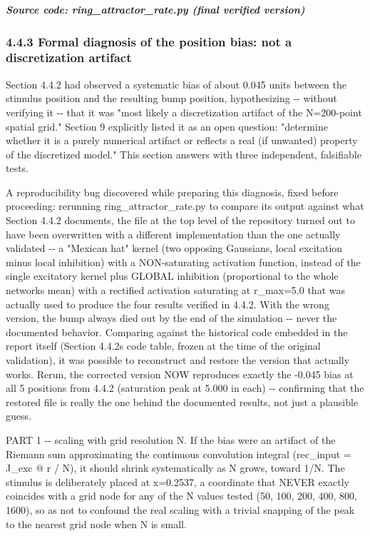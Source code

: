 \documentclass[
  english,
]{article}
\begin{document}
\textit{\textbf{Source code: ring\_\allowbreak{}attractor\_\allowbreak{}rate.py (final verified version)}}


\subsubsection{4.4.3 Formal diagnosis of the position bias: not a discretization artifact}\label{formal-diagnosis-of-the-position-bias-not-a-discretization-artifact}

Section 4.4.2 had observed a systematic bias of about 0.045 units between the stimulus position and the resulting bump position, hypothesizing -\/- without verifying it -\/- that it was "most likely a discretization artifact of the N=200-point spatial grid." Section 9 explicitly listed it as an open question: "determine whether it is a purely numerical artifact or reflects a real (if unwanted) property of the discretized model." This section answers with three independent, falsifiable tests.

A reproducibility bug discovered while preparing this diagnosis, fixed before proceeding: rerunning ring\_\allowbreak{}attractor\_\allowbreak{}rate.py to compare its output against what Section 4.4.2 documents, the file at the top level of the repository turned out to have been overwritten with a different implementation than the one actually validated -\/- a "Mexican hat" kernel (two opposing Gaussians, local excitation minus local inhibition) with a NON-saturating activation function, instead of the single excitatory kernel plus GLOBAL inhibition (proportional to the whole network\textquotesingle s mean) with a rectified activation saturating at r\_\allowbreak{}max=5.0 that was actually used to produce the four results verified in 4.4.2. With the wrong version, the bump always died out by the end of the simulation -\/- never the documented behavior. Comparing against the historical code embedded in the report itself (Section 4.4.2\textquotesingle s code table, frozen at the time of the original validation), it was possible to reconstruct and restore the version that actually works. Rerun, the corrected version NOW reproduces exactly the -0.045 bias at all 5 positions from 4.4.2 (saturation peak at 5.000 in each) -\/- confirming that the restored file is really the one behind the documented results, not just a plausible guess.

PART 1 -\/- scaling with grid resolution N. If the bias were an artifact of the Riemann sum approximating the continuous convolution integral (rec\_\allowbreak{}input = J\_\allowbreak{}exc @ r / N), it should shrink systematically as N grows, toward 1/N. The stimulus is deliberately placed at x=0.2537, a coordinate that NEVER exactly coincides with a grid node for any of the N values tested (50, 100, 200, 400, 800, 1600), so as not to confound the real scaling with a trivial snapping of the peak to the nearest grid node when N is small.
\end{document}
